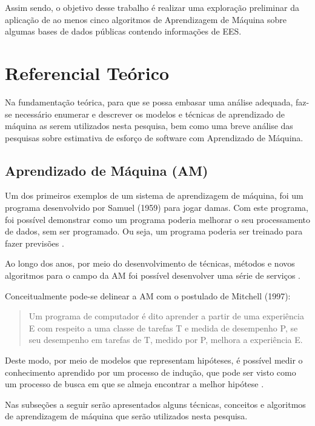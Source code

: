 \documentclass[12pt]{article}
\begin{document}
Assim sendo, o objetivo desse trabalho é realizar uma exploração preliminar da aplicação de ao menos cinco algoritmos de Aprendizagem de Máquina sobre algumas bases de dados públicas contendo informações de EES.

\section{Referencial Teórico} \label{sec:refteorico}

Na fundamentação teórica, para que se possa embasar uma análise adequada, faz-se necessário enumerar e descrever os modelos e técnicas de aprendizado de máquina as serem utilizados nesta pesquisa, bem como uma breve análise das pesquisas sobre estimativa de esforço de software com Aprendizado de Máquina.

\subsection{Aprendizado de Máquina (AM)}

Um dos primeiros exemplos de um sistema de aprendizagem de máquina, foi um programa desenvolvido por Samuel (1959) para jogar damas. Com este programa, foi possível demonstrar como um programa poderia melhorar o seu processamento de dados, sem ser programado. Ou seja, um programa poderia ser treinado para fazer previsões \cite{ieee:2013,samuel:1959}.

Ao longo dos anos, por meio do desenvolvimento de técnicas, métodos e novos algoritmos para o campo da AM foi possível desenvolver uma série de serviços \cite{abadaletal:2020}.

Conceitualmente pode-se delinear a AM com o postulado de Mitchell (1997):
\begin{quote}
  Um programa de computador é dito aprender a partir de uma experiência E com respeito a uma classe de tarefas T e medida de desempenho P, se seu desempenho em tarefas de T, medido por P, melhora a experiência E. \cite[p. 2, tradução nossa]{mitchell:1997}
\end{quote}

Deste modo, por meio de modelos que representam hipóteses, é possível medir o conhecimento aprendido por um processo de indução, que pode ser visto como um processo de busca em que se almeja encontrar a melhor hipótese \cite{stuartnorvig:2013}.

Nas subseções a seguir serão apresentados alguns técnicas, conceitos e algoritmos de aprendizagem de máquina que serão utilizados nesta pesquisa.
\end{document}
